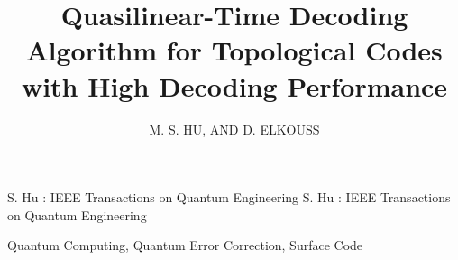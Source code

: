 \documentclass{ieeeaccess}
\begin{document}

\title{Quasilinear-Time Decoding Algorithm for Topological Codes with High Decoding Performance}
\author{
    \uppercase{M. S. Hu},
    \uppercase{and D. Elkouss}
}
\address[1]{Department of Physics, Delft University of Technology (email: watermarkhu@outlook.com)}
\address[2]{QuTech, Delft University of Technology, Lorentzweg 1, 2628CJ Delft, The Netherlands (email: d.elkousscoronas@qutech.nl)}


\markboth
{S. Hu \headeretal: IEEE Transactions on Quantum Engineering}
{S. Hu \headeretal: IEEE Transactions on Quantum Engineering}


\begin{abstract}
    
\end{abstract}

\begin{keywords}
    Quantum Computing, Quantum Error Correction, Surface Code
\end{keywords}

\titlepgskip=-30pt
\maketitle








\FloatBarrier




\EOD
\end{document}
